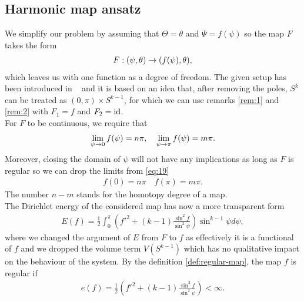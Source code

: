 \subsection{Harmonic map ansatz}
\label{sec:basic-setup}

We simplify our problem by assuming that $\Theta=\theta$ and
$\Psi=f(\psi)$ so the map $F$ takes the form
\begin{align}
  \label{eq:18}
  F:(\psi,\theta)\rightarrow(f(\psi),\theta),
\end{align}
which leaves us with one function as a degree of freedom. The given
setup has been introduced in ~\cite{Eells1964} and it is based on an
idea that, after removing the poles, $S^k$ can be treated as
$(0,\pi)\times S^{k-1}$, for which we can use remarks \ref{rem:1} and
\ref{rem:2} with $F_1=f$ and $F_2=\text{id}$.\\

For $F$ to be continuous, we require that
\begin{align}
  \label{eq:19}
  \lim_{\psi\rightarrow0}f(\psi)=n\pi,\quad\lim_{\psi\rightarrow\pi}f(\psi)=m\pi.
\end{align}
Moreover, closing the domain of $\psi$ will not have any implications
as long as $F$ is regular so we can drop the limits from \eqref{eq:19}
\begin{align}
  \label{eq:20}
  f(0)=n\pi\quad f(\pi)=m\pi.
\end{align}
The number $n-m$ stands for the homotopy degree of a
map.\\

The Dirichlet energy of the considered map has now a more transparent
form
\begin{align}
  \label{eq:21}
  E(f)=\frac{1}{2}\int_{0}^{\pi}
  \left(f'^2+(k-1)\frac{\sin^2f}{\sin^2\psi}\right) \sin^{k-1}\psi
  d\psi,
\end{align}
where we changed the argument of $E$ from $F$ to $f$ as effectively it
is a functional of $f$ and we dropped the volume term $V(S^{k-1})$
which has no qualitative impact on the behaviour of the system.
By the definition \ref{def:regular-map}, the map $f$ is regular if
\begin{align}
  \label{eq:23}
  e(f)=\frac{1}{2}\left(f'^2+(k-1)\frac{\sin^2f}{\sin^2\psi}\right)<\infty.
\end{align}

